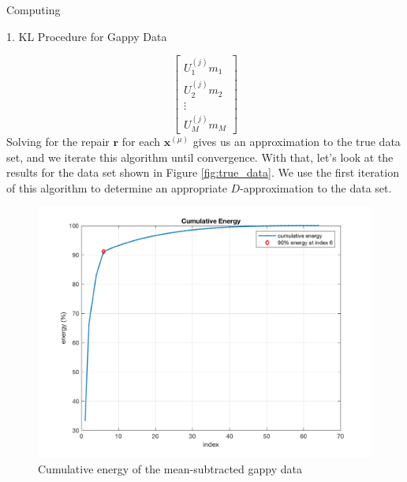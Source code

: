 \begin{section}{Computing}
\begin{homeworkSection}{1. KL Procedure for Gappy Data}
{$$\begin{bmatrix}
            U^{(j)}_1 m_1 \\ U^{(j)}_2 m_2 \\\vdots \\ U^{(j)}_M m_M
        \end{bmatrix}
    $$
    Solving for the repair $\bm{r}$ for each $\bm{x}^{(\mu)}$ gives us an approximation to the true data set, and we iterate this algorithm until convergence. With that, let's look at the results for the data set shown in Figure \ref{fig:true_data}. We use the first iteration of this algorithm to determine an appropriate $D$-approximation to the data set.
    \begin{minipage}{1.0\textwidth}
        \begin{figure}[H]
        \centering
        \includegraphics[trim={0cm 0cm 0cm 0cm},clip,width=0.70\columnwidth]{../data/cumulative_energy}
        \caption{Cumulative energy of the mean-subtracted gappy data}
        \label{fig:energy}
        \end{figure}
    \end{minipage}
}
\newpage
{}
\end{homeworkSection}
\end{section}
